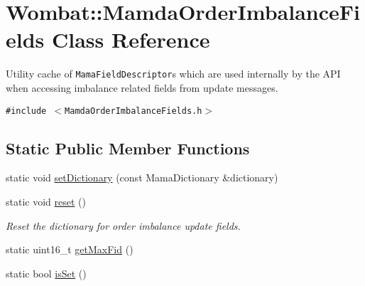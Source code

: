 \hypertarget{classWombat_1_1MamdaOrderImbalanceFields}{
\section{Wombat::Mamda\-Order\-Imbalance\-Fields Class Reference}
\label{classWombat_1_1MamdaOrderImbalanceFields}
}
Utility cache of {\tt Mama\-Field\-Descriptor}s which are used internally by the API when accessing imbalance related fields from update messages.  


{\tt \#include $<$Mamda\-Order\-Imbalance\-Fields.h$>$}

\subsection*{Static Public Member Functions}
\begin{CompactItemize}
\item 
static void \hyperlink{classWombat_1_1MamdaOrderImbalanceFields_e63c54bfcd113c93e66a29bae959770f}{set\-Dictionary} (const Mama\-Dictionary \&dictionary)
\item 
static void \hyperlink{classWombat_1_1MamdaOrderImbalanceFields_a263d2dfa02fe1ca2bd754d93c2d9acf}{reset} ()
\begin{CompactList}\small\item\em Reset the dictionary for order imbalance update fields. \item\end{CompactList}\item 
static uint16\_\-t \hyperlink{classWombat_1_1MamdaOrderImbalanceFields_50ed8628a53dd7d4694cc3d99b505901}{get\-Max\-Fid} ()
\item 
static bool \hyperlink{classWombat_1_1MamdaOrderImbalanceFields_15e5163f7a0749f88bddd4afb352ae24}{is\-Set} ()
\end{CompactItemize}
